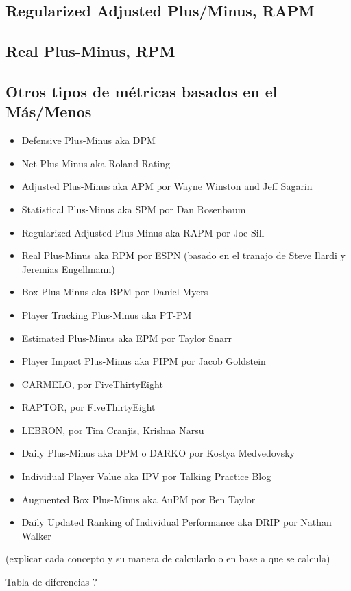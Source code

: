 \documentclass[paper=a4, fontsize=9pt]{article}
\begin{document}
\subsection{Regularized Adjusted Plus/Minus, RAPM}

\subsection{Real Plus-Minus, RPM}

\subsection{Otros tipos de métricas basados en el Más/Menos}

\begin{itemize}
\item Defensive Plus-Minus aka DPM
\item Net Plus-Minus aka Roland Rating
\item Adjusted Plus-Minus aka APM por Wayne Winston and Jeff Sagarin
\item Statistical Plus-Minus aka SPM por Dan Rosenbaum
\item Regularized Adjusted Plus-Minus aka RAPM por Joe Sill
\item Real Plus-Minus aka RPM por ESPN (basado en el tranajo de Steve Ilardi y Jeremias Engellmann)
\item Box Plus-Minus aka BPM por Daniel Myers
\item Player Tracking Plus-Minus aka PT-PM
\item Estimated Plus-Minus aka EPM por Taylor Snarr
\item Player Impact Plus-Minus aka PIPM por Jacob Goldstein
\item CARMELO, por FiveThirtyEight
\item RAPTOR, por FiveThirtyEight
\item LEBRON, por Tim Cranjis, Krishna Narsu
\item Daily Plus-Minus aka DPM o DARKO por Kostya Medvedovsky
\item Individual Player Value aka IPV por Talking Practice Blog
\item Augmented Box Plus-Minus aka AuPM por Ben Taylor
\item Daily Updated Ranking of Individual Performance aka DRIP por Nathan Walker
\end{itemize}

(explicar cada concepto y su manera de calcularlo o en base a que se calcula)

Tabla de diferencias ?

\clearpage
\end{document}
